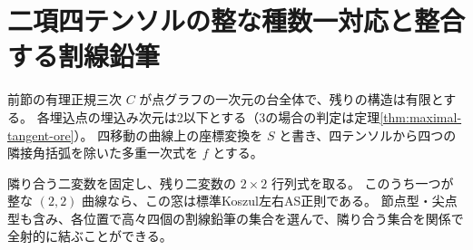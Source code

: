 \section{二項四テンソルの整な種数一対応と整合する割線鉛筆}
\label{sec:elliptic-binary-cubic-pencils}
前節の有理正規三次 $C$ が点グラフの一次元の台全体で、残りの構造は有限とする。
各埋込点の埋込み次元は2以下とする（3の場合の判定は定理\ref{thm:maximal-tangent-ore}）。
四移動の曲線上の座標変換を $S$ と書き、四テンソルから四つの隣接角括弧を除いた多重一次式を $f$ とする。
\begin{theorem}\label{thm:elliptic-binary-cubic-pencils}
隣り合う二変数を固定し、残り二変数の $2\times2$ 行列式を取る。
このうち一つが整な $(2,2)$ 曲線なら、この窓は標準Koszul左右AS正則である。
節点型・尖点型も含み、各位置で高々四個の割線鉛筆の集合を選んで、隣り合う集合を関係で全射的に結ぶことができる。
\end{theorem}

